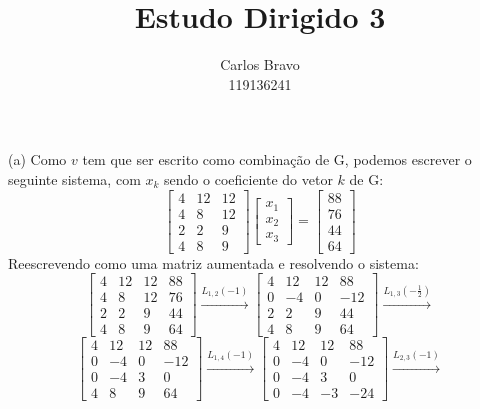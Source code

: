 \documentclass{homework}
\title{Estudo Dirigido 3}
\author{Carlos Bravo\\ 119136241}
\begin{document}
\maketitle

\exercise*
(a) Como $v$ tem que ser escrito como combinação de G, podemos escrever o seguinte sistema, com $x_k$ sendo o coeficiente do vetor $k$ de G:
\[
\begin{bmatrix}
4 & 12 & 12\\
4 & 8 & 12\\
2 & 2 & 9\\
4 & 8 & 9
\end{bmatrix}
\begin{bmatrix}
x_1\\
x_2\\
x_3
\end{bmatrix}
=
\begin{bmatrix}
88\\
76\\
44\\
64
\end{bmatrix}
\]
Reescrevendo como uma matriz aumentada e resolvendo o sistema:
\[
\left[ \begin{array}{ccc|c}
    4 & 12 & 12 & 88\\
    4 & 8 & 12 & 76\\
    2 & 2 & 9 & 44\\
    4 & 8 & 9 & 64
\end{array} \right] \xrightarrow{L_{1,2}(-1)}
\left[ \begin{array}{ccc|c}
    4 & 12 & 12 & 88\\
    0 & -4 & 0 & -12\\
    2 & 2 & 9 & 44\\
    4 & 8 & 9 & 64
\end{array} \right] \xrightarrow{L_{1,3}(-\frac{1}{2})}
\]
\[
\left[ \begin{array}{ccc|c}
    4 & 12 & 12 & 88\\
    0 & -4 & 0 & -12\\
    0 & -4 & 3 & 0\\
    4 & 8 & 9 & 64
\end{array} \right] \xrightarrow{L_{1,4}(-1)}
\left[ \begin{array}{ccc|c}
    4 & 12 & 12 & 88\\
    0 & -4 & 0 & -12\\
    0 & -4 & 3 & 0\\
    0 & -4 & -3 & -24
\end{array} \right] \xrightarrow{L_{2,3}(-1)}
\]
\end{document}
